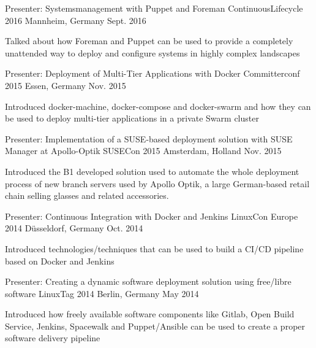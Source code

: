 

\begin{cventries}


  \cventry
    {Presenter: Systemsmanagement with Puppet and Foreman}
    {ContinuousLifecycle 2016}
    {Mannheim, Germany}
    {Sept. 2016}
    {
      \begin{cvitems}
      \item {Talked about how Foreman and Puppet can be used to provide a completely unattended way to deploy and configure systems in highly complex landscapes}
      \end{cvitems}
    }
  \cventry
    {Presenter: Deployment of Multi-Tier Applications with Docker}
    {Committerconf 2015}
    {Essen, Germany}
    {Nov. 2015}
    {
      \begin{cvitems}
      \item {Introduced docker-machine, docker-compose and docker-swarm and how they can be used to deploy multi-tier applications in a private Swarm cluster}
      \end{cvitems}
    }
  \cventry
    {Presenter: Implementation of a SUSE-based deployment solution with SUSE Manager at Apollo-Optik}
    {SUSECon 2015}
    {Amsterdam, Holland}
    {Nov. 2015}
    {
      \begin{cvitems}
      \item {Introduced the B1 developed solution used to automate the whole deployment process of new branch servers used by Apollo Optik, a large German-based retail chain selling glasses and related accessories.}
      \end{cvitems}
    }
  \cventry
    {Presenter: Continuous Integration with Docker and Jenkins} %
    {LinuxCon Europe 2014} %
    {Düsseldorf, Germany} %
    {Oct. 2014} %
    {
      \begin{cvitems} %
        \item {Introduced technologies/techniques that can be used to build a CI/CD pipeline based on Docker and Jenkins}
      \end{cvitems}
    }
  \cventry
    {Presenter: Creating a dynamic software deployment solution using free/libre software} %
    {LinuxTag 2014} %
    {Berlin, Germany} %
    {May 2014} %
    {
      \begin{cvitems} %
        \item {Introduced how freely available software components like Gitlab, Open Build Service, Jenkins, Spacewalk and Puppet/Ansible can be used to create a proper software delivery pipeline}
      \end{cvitems}
    }

\end{cventries}
